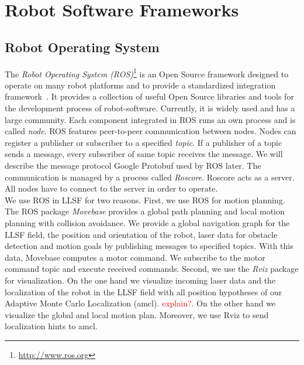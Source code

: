\section{Robot Software Frameworks}
\label{sec:robot_software_frameworks}

\subsection{Robot Operating System}
The \textit{Robot Operating System (ROS)}\footnote{\url{http://www.ros.org}} is an Open Source framework designed to operate on many robot platforms and to provide a standardized integration framework~\cite{Ros}. It provides a collection of useful Open Source libraries and tools for the development process of robot-software. Currently, it is widely used and has a large community. Each component integrated in ROS runs an own process and is called \textit{node}. ROS features peer-to-peer communication between nodes. Nodes can register a publisher or subscriber to a specified \textit{topic}. If a publisher of a topic sends a message, every subscriber of same topic receives the message. We will describe the message protocol Google Protobuf used by ROS later. The communication is managed by a process called \textit{Roscore}. Roscore acts as a server. All nodes have to connect to the server in order to operate.\\
We use ROS in LLSF for two reasons. First, we use ROS for motion planning. The ROS package \textit{Movebase} provides a global path planning and local motion planning with collision avoidance. We provide a global navigation graph for the LLSF field, the position and orientation of the robot, laser data for obstacle detection and motion goals by publishing messages to specified topics. With this data, Movebase computes a motor command. We subscribe to the motor command topic and execute received commands. Second, we use the \textit{Rviz} package for visualization. On the one hand we visualize incoming laser data and the localization of the robot in the LLSF field with all position hypotheses of our Adaptive Monte Carlo Localization (amcl). \textcolor{red}{explain?}. On the other hand we visualize the global and local motion plan. Moreover, we use Rviz to send localization hints to amcl.

